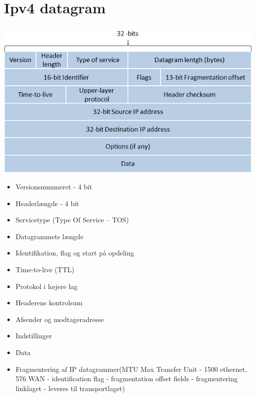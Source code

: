 {{{{{{{\section{Ipv4 datagram}
{\includegraphics{4-network-layer/IPv4_datagram.png}
\begin{itemize}
	\item Versionsnummeret - 4 bit
	\item Headerlængde - 4 bit
	\item Servicetype (Type Of Service – TOS)
	\item Datagrammets længde
	\item Identifikation, flag og start på opdeling
	\item Time-to-live (TTL)
	\item Protokol i højere lag
	\item Headerens kontrolsum
	\item Afsender og modtageradresse
	\item Indstillinger
	\item Data
	\item Fragmentering af IP datagrammer(MTU Max Transfer Unit - 1500 ethernet, 576 WAN - identification flag - fragmentation offset fields - fragmentering  linklaget - leveres til transportlaget) 
\end{itemize}

}}}}}}}}
